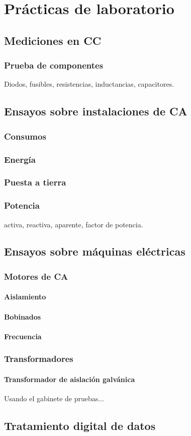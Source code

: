 \chapter{Prácticas de laboratorio}

\section{Mediciones en CC}
\subsection{Prueba de componentes}
Diodos, fusibles, resistencias, inductancias, capacitores.
\section{Ensayos sobre instalaciones de CA}
\subsection{Consumos}
\subsection{Energía}
\subsection{Puesta a tierra}
\subsection{Potencia}
activa, reactiva, aparente, factor de potencia.

\section{Ensayos sobre máquinas eléctricas}
\subsection{Motores de CA}
\subsubsection{Aislamiento}
\subsubsection{Bobinados}
\subsubsection{Frecuencia}
\subsection{Transformadores}
	\subsubsection{Transformador de aislación galvánica}
	Usando el gabinete de pruebas...
\section{Tratamiento digital de datos}